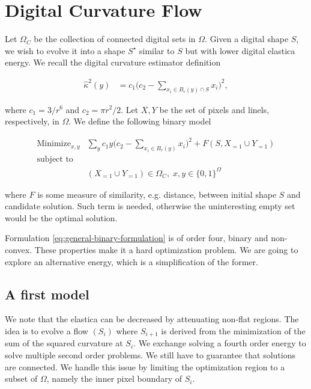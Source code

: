\documentclass[runningheads]{llncs}
\begin{document}
\section{Digital Curvature Flow}

	Let $\Omega_C$ be the collection of connected digital sets in $\Omega$. Given a digital shape $S$, we wish to evolve it into a shape $S^\star$ similar to $S$ but with lower digital elastica energy. We recall the digital curvature estimator definition
	
\begin{align}
	\hat{\kappa}^2(y) &= c_1\Big( c_2 - \sum_{x_i \in B_r(y) \cap S}{x_i} \Big)^2, 
	\label{eq:curvature-estimator-pixels}
\end{align}

where $c_1=3/r^6$ and $c_2=\pi r^2/2$. Let $X,Y$ be the set of pixels and linels, respectively, in $\Omega$. We define the following binary model
		
\begin{align}
\text{Minimize}_{x,y} & \sum_{y}{c_1y \Big(c_2 - \sum_{x_i \in B_r(y)}{x_i}\Big)^2	 } + F(S,X_{=1} \cup Y_{=1}) \nonumber \\
\text{subject to} & \nonumber \\
& (X_{=1} \cup Y_{=1}) \in \Omega_C, \; x,y \in \{0,1\}^\Omega
\label{eq:general-binary-formulation}
\end{align}


where $F$ is some measure of similarity, e.g. distance, between initial shape $S$ and candidate solution. Such term is needed, otherwise the uninteresting empty set would be the optimal solution.

Formulation \eqref{eq:general-binary-formulation} is of order four, binary and non-convex. These properties make it a hard optimization problem. We are going to explore an alternative energy, which is a simplification of the former.

\subsection{A first model}

We note that the elastica can be decreased by attenuating non-flat regions. The idea is to evolve a flow $(S_i)$ where $S_{i+1}$ is derived from the minimization of the sum of the squared curvature at $S_i$. We exchange solving a fourth order energy to solve multiple second order problems. We still have to guarantee that solutions are connected. We handle this issue by limiting the optimization region to a subset of $\Omega$, namely the inner pixel boundary of  $S_i$.
\end{document}

